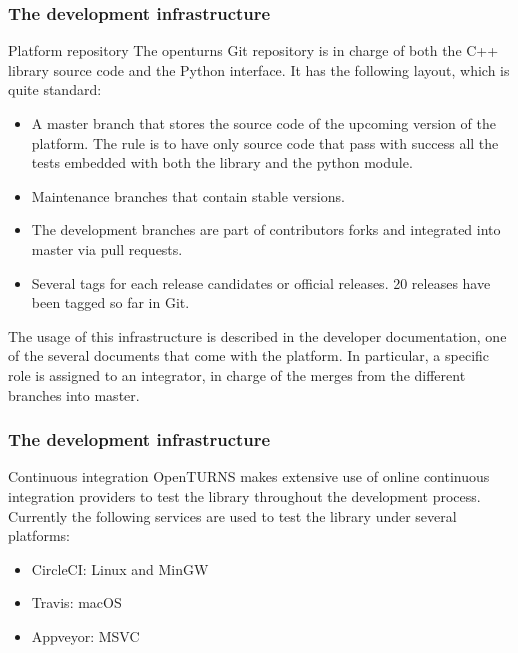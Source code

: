 \documentclass[8pt]{beamer}
\begin{document}
\begin{frame}
  \frametitle{The development infrastructure}
  \begin{block}{Platform repository}
    The openturns Git repository is in charge of both the C++ library source code and the Python interface. It has the following layout, which is quite standard:
    \begin{itemize}
    \item A master branch that stores the source code of the upcoming version of the platform. The rule is to have only source code that pass with success all the tests embedded with both the library and the python module.
    \item Maintenance branches that contain stable versions.
    \item The development branches are part of contributors forks and integrated into master via pull requests.
    \item Several tags for each release candidates or official releases. 20 releases have been tagged so far in Git.
    \end{itemize}
    The usage of this infrastructure is described in the developer documentation, one of the several documents that come with the platform. In particular, a specific role is assigned to an \alert{integrator}, in charge of the merges from the different branches into master.
  \end{block}
\end{frame}
\begin{frame}
  \frametitle{The development infrastructure}
  \begin{block}{Continuous integration}
    OpenTURNS makes extensive use of online continuous integration providers to test the library throughout the development process. Currently the following services are used to test the library under several platforms:
    \begin{itemize}
    \item CircleCI: Linux and MinGW
    \item Travis: macOS
    \item Appveyor: MSVC
    \end{itemize}
  \end{block}
\end{frame}
\end{document}
